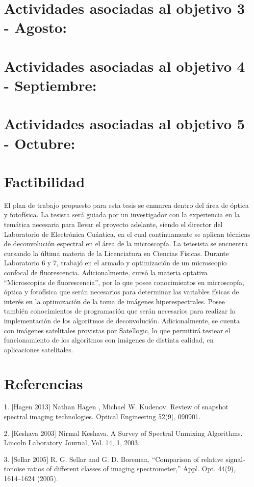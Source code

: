 \documentclass{ctuthesis}
\begin{document}
\section*{Actividades asociadas al objetivo 3 - Agosto:}
\section*{Actividades asociadas al objetivo 4 - Septiembre:}
\section*{Actividades asociadas al objetivo 5 - Octubre:}
\section*{Factibilidad}
El plan de trabajo propuesto para esta tesis se enmarca dentro del área de óptica y fotofísica. La tesista será guiada por un investigador con la experiencia en la temática necesaria para llevar el proyecto adelante, siendo el director del Laboratorio de Electrónica Cuántica, en el cual continuamente se aplican técnicas de deconvolución espectral en el área de la microscopía.
La tetesista se encuentra cursando la última materia de la Licenciatura en Ciencias Físicas. Durante Laboratorio 6 y 7, trabajó en el armado y optimización de un microscopio confocal de fluorescencia. Adicionalmente, cursó la materia optativa “Microscopías de fluorescencia”, por lo que posee conocimientos en microscopía, óptica y fotofísica que serán necesarios para determinar las variables físicas de interés en la optimización de la toma de imágenes hiperespectrales. Posee también conocimientos de programación que serán necesarios para realizar la implementación de los algoritmos de deconvolución.
Adicionalmente, se cuenta con imágenes satelitales provistas por Satellogic, lo que permitirá testear el funcionamiento de los algoritmos con imágenes de distinta calidad, en aplicaciones satelitales. 
\section*{Referencias}
1. [Hagen 2013] Nathan Hagen , Michael W. Kudenov. Review of snapshot spectral imaging technologies. Optical Engineering 52(9), 090901.

2. [Keshava 2003] Nirmal Keshava. A Survey of Spectral Unmixing Algorithms. Lincoln Laboratory Journal, Vol. 14, 1, 2003.

3. [Sellar 2005] R. G. Sellar and G. D. Boreman, “Comparison of relative signal-tonoise
ratios of different classes of imaging spectrometer,” Appl. Opt. 44(9), 1614–1624 (2005).
\end{document}
